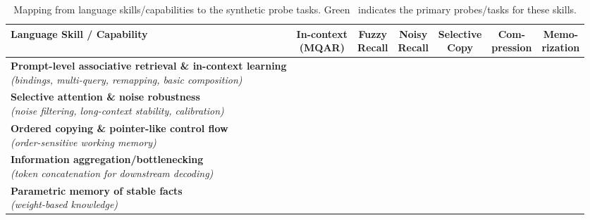 \documentclass{article}
\newcommand{\gmark}{\textcolor{green!60!black}{\ding{51}}}
\newcommand{\rmark}{\textcolor{red!70!black}{\ding{55}}}
\begin{document}
\begin{table}[t]
\centering
\small
\caption{Mapping from language skills/capabilities to the synthetic probe tasks. Green \gmark~indicates the primary probes/tasks for these skills.}
\label{tab:skill-mapping-grouped}
\setlength{\tabcolsep}{5pt}
\renewcommand{\arraystretch}{1.12}

\begin{tabularx}{\textwidth}{@{}Xcccccc@{}}
\toprule
\textbf{Language Skill / Capability} &
\makecell[c]{\textbf{In-context}\\\textbf{(MQAR)}} &
\makecell[c]{\textbf{Fuzzy}\\\textbf{Recall}} &
\makecell[c]{\textbf{Noisy}\\\textbf{Recall}} &
\makecell[c]{\textbf{Selective}\\\textbf{Copy}} &
\makecell[c]{\textbf{Com-}\\\textbf{pression}} &
\makecell[c]{\textbf{Memo-}\\\textbf{rization}} \\
\midrule

\makecell[l]{\textbf{Prompt-level associative retrieval \& in-context learning}\\\emph{(bindings, multi-query, remapping, basic composition)}}
& \gmark & \gmark & \gmark & \gmark & \rmark & \rmark \\

\makecell[l]{\textbf{Selective attention \& noise robustness}\\\emph{(noise filtering, long-context stability, calibration)}}
& \rmark & \rmark & \gmark & \gmark & \rmark & \rmark \\

\makecell[l]{\textbf{Ordered copying \& pointer-like control flow}\\\emph{(order-sensitive working memory)}}
& \rmark & \rmark & \rmark & \gmark & \rmark & \rmark \\

\makecell[l]{\textbf{Information aggregation/bottlenecking}\\\emph{(token concatenation for downstream decoding)}}
& \rmark & \rmark & \rmark & \rmark & \gmark & \rmark \\

\makecell[l]{\textbf{Parametric memory of stable facts}\\\emph{(weight-based knowledge)}}
& \rmark & \rmark & \rmark & \rmark & \rmark & \gmark \\

\bottomrule
\end{tabularx}

\end{table}
\end{document}
